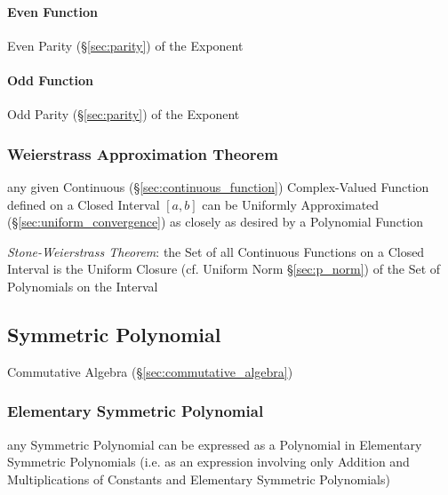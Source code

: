 
\paragraph{Even Function}\label{sec:even_function}\hfill

Even Parity (\S\ref{sec:parity}) of the Exponent



\paragraph{Odd Function}\label{sec:odd_function}\hfill

Odd Parity (\S\ref{sec:parity}) of the Exponent



\subsubsection{Weierstrass Approximation Theorem}
\label{sec:weierstrass_approximation}

any given Continuous (\S\ref{sec:continuous_function}) Complex-Valued Function
defined on a Closed Interval $[a,b]$ can be Uniformly Approximated
(\S\ref{sec:uniform_convergence}) as closely as desired by a Polynomial Function

\emph{Stone-Weierstrass Theorem}: the Set of all Continuous Functions on a
Closed Interval is the Uniform Closure (cf. Uniform Norm \S\ref{sec:p_norm}) of
the Set of Polynomials on the Interval



\subsection{Symmetric Polynomial}\label{sec:symmetric_polynomial}

\fist Commutative Algebra (\S\ref{sec:commutative_algebra})



\subsubsection{Elementary Symmetric Polynomial}\label{sec:elementary_symmetric}

any Symmetric Polynomial can be expressed as a Polynomial in Elementary
Symmetric Polynomials (i.e. as an expression involving only Addition and
Multiplications of Constants and Elementary Symmetric Polynomials)

